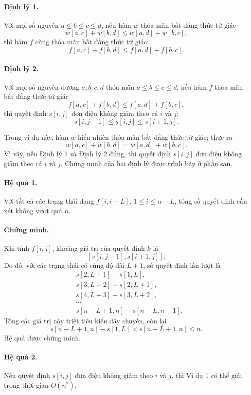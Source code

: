 \documentclass[11pt]{article}
\begin{document}
\paragraph{Định lý 1.}
Với mọi số nguyên $a\le b\le c\le d$, nếu hàm $w$ thỏa mãn bất đẳng thức tứ
giác
\[
  w[a,c]+w[b,d]\le w[a,d]+w[b,c],
\]
thì hàm $f$ cũng thỏa mãn bất đẳng thức tứ giác:
\[
  f[a,c]+f[b,d]\le f[a,d]+f[b,c].
\]

\paragraph{Định lý 2.}
Với mọi số nguyên dương $a,b,c,d$ thỏa mãn $a\le b\le c\le d$, nếu hàm $f$
thỏa mãn bất đẳng thức tứ giác
\[
  f[a,c]+f[b,d]\le f[a,d]+f[b,c],
\]
thì quyết định $s[i,j]$ đơn điệu không giảm theo cả $i$ và $j$:
\[
  s[i,j-1]\le s[i,j]\le s[i+1,j].
\]

Trong ví dụ này, hàm $w$ hiển nhiên thỏa mãn bất đẳng thức tứ giác; thực ra
\[
  w[a,c]+w[b,d]=w[a,d]+w[b,c].
\]
Vì vậy, nếu Định lý 1 và Định lý 2 đúng, thì quyết định $s[i,j]$ đơn điệu
không giảm theo cả $i$ và $j$. Chứng minh của hai định lý được trình bày ở
phần sau.

\paragraph{Hệ quả 1.}
Với tất cả các trạng thái dạng $f[i,i+L]$, $1\le i\le n-L$, tổng số quyết
định cần xét không vượt quá $n$.

\paragraph{Chứng minh.}
Khi tính $f[i,j]$, khoảng giá trị của quyết định $k$ là
\[
  [s[i,j-1],s[i+1,j]].
\]
Do đó, với các trạng thái có cùng độ dài $L+1$, số quyết định lần lượt là
\[
\begin{aligned}
  &s[2,L+1]-s[1,L],\\
  &s[3,L+2]-s[2,L+1],\\
  &s[4,L+3]-s[3,L+2],\\
  &\cdots\\
  &s[n-L+1,n]-s[n-L,n-1].
\end{aligned}
\]
Tổng các giá trị này triệt tiêu kiểu dây chuyền, còn lại
\[
  s[n-L+1,n]-s[1,L]<s[n-L+1,n]\le n.
\]
Hệ quả được chứng minh.

\paragraph{Hệ quả 2.}
Nếu quyết định $s[i,j]$ đơn điệu không giảm theo $i$ và $j$, thì Ví dụ 1 có
thể giải trong thời gian $O(n^2)$.
\end{document}
